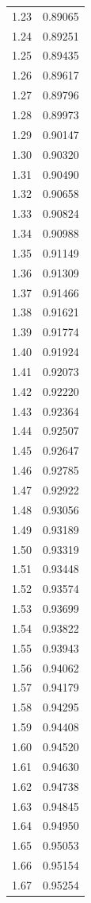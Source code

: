 \documentclass[
  letterpaper,
  DIV=11,
  numbers=noendperiod]{scrartcl}
\begin{document}
\begin{longtable}[]{@{}cc@{}}
1.23 & 0.89065 \\
1.24 & 0.89251 \\
1.25 & 0.89435 \\
1.26 & 0.89617 \\
1.27 & 0.89796 \\
1.28 & 0.89973 \\
1.29 & 0.90147 \\
1.30 & 0.90320 \\
1.31 & 0.90490 \\
1.32 & 0.90658 \\
1.33 & 0.90824 \\
1.34 & 0.90988 \\
1.35 & 0.91149 \\
1.36 & 0.91309 \\
1.37 & 0.91466 \\
1.38 & 0.91621 \\
1.39 & 0.91774 \\
1.40 & 0.91924 \\
1.41 & 0.92073 \\
1.42 & 0.92220 \\
1.43 & 0.92364 \\
1.44 & 0.92507 \\
1.45 & 0.92647 \\
1.46 & 0.92785 \\
1.47 & 0.92922 \\
1.48 & 0.93056 \\
1.49 & 0.93189 \\
1.50 & 0.93319 \\
1.51 & 0.93448 \\
1.52 & 0.93574 \\
1.53 & 0.93699 \\
1.54 & 0.93822 \\
1.55 & 0.93943 \\
1.56 & 0.94062 \\
1.57 & 0.94179 \\
1.58 & 0.94295 \\
1.59 & 0.94408 \\
1.60 & 0.94520 \\
1.61 & 0.94630 \\
1.62 & 0.94738 \\
1.63 & 0.94845 \\
1.64 & 0.94950 \\
1.65 & 0.95053 \\
1.66 & 0.95154 \\
1.67 & 0.95254 \\

\end{longtable}
\end{document}
